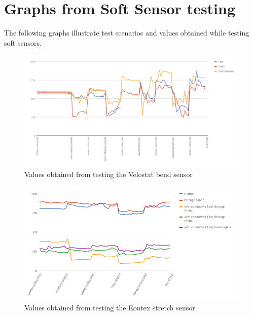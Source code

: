 \newpage
\section{Graphs from Soft Sensor testing}
\label{appendix:SS_graphs}

The following graphs illustrate test scenarios and values obtained while testing soft sensors.

\begin{figure}[ht]
    \centering
    \includegraphics[scale=0.44, angle=90]{images/HW/velostat.png}
    \caption{Values obtained from testing the Velostat bend sensor}
    \label{fig:velostat_graph}
\end{figure}

\clearpage
\newpage

\begin{figure}[hbtp]
    \centering
    \includegraphics[scale=0.8, angle=90]{images/HW/eontex.png}
    \caption{Values obtained from testing the Eontex stretch sensor}
    \label{fig:eontex_graph}
\end{figure}

\clearpage